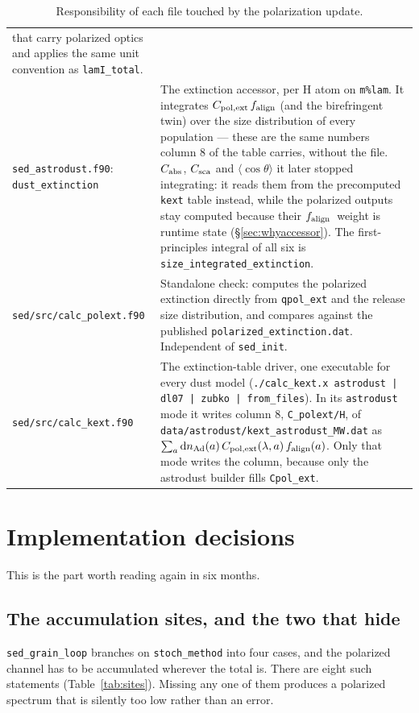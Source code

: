 \documentclass{my_memo}
\newcommand{\code}[1]{\texttt{#1}}
\newcommand{\Cabs}{\ensuremath{C_{\rm abs}}}
\newcommand{\falign}{\ensuremath{f_{\rm align}}}
\begin{document}
\begin{table}[h]
\begin{tabular}{@{}p{}p{}@{}}
that carry polarized optics and applies the same unit convention as
\code{lamI\_total}. \\[2pt]
\code{sed\_astrodust.f90}: \code{dust\_extinction} &
The extinction accessor, per H atom on \code{m\%lam}. It integrates
$C_{\rm pol,ext}\,\falign$ (and the birefringent twin) over the size
distribution of every population --- these are the same numbers column 8 of the
table carries, without the file. \Cabs, $C_{\rm sca}$ and
$\langle\cos\theta\rangle$ it later stopped integrating: it reads them from the
precomputed \code{kext} table instead, while the polarized outputs stay
computed because their \falign\ weight is runtime state
(\S\ref{sec:whyaccessor}). The first-principles integral of all six is
\code{size\_integrated\_extinction}. \\[2pt]
\code{sed/src/calc\_polext.f90} &
Standalone check: computes the polarized extinction directly from
\code{qpol\_ext} and the release size distribution, and compares against the
published \code{polarized\_extinction.dat}. Independent of \code{sed\_init}. \\[2pt]
\code{sed/src/calc\_kext.f90} &
The extinction-table driver, one executable for every dust model
(\code{./calc\_kext.x astrodust\,|\,dl07\,|\,zubko\,|\,from\_files}). In its
\code{astrodust} mode it writes column 8, \code{C\_polext/H}, of
\code{data/astrodust/kext\_astrodust\_MW.dat} as
$\sum_a {\rm d}n_{\rm Ad}(a)\,C_{\rm pol,ext}(\lambda,a)\,\falign(a)$. Only that
mode writes the column, because only the astrodust builder fills
\code{Cpol\_ext}. \\
\bottomrule
\end{tabular}
\caption{Responsibility of each file touched by the polarization update.}
\label{tab:modules}
\end{table}

\section{Implementation decisions}

This is the part worth reading again in six months.

\subsection{The accumulation sites, and the two that hide}\label{sec:sites}

\code{sed\_grain\_loop} branches on \code{stoch\_method} into four cases, and
the polarized channel has to be accumulated wherever the total is. There are
eight such statements (Table~\ref{tab:sites}). Missing any one of them produces
a polarized spectrum that is silently too low rather than an error.
\end{document}
